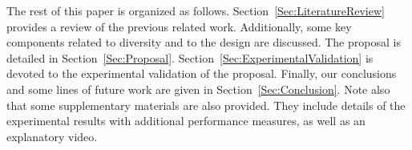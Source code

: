 The rest of this paper is organized as follows. 
%
Section~\ref{Sec:LiteratureReview} provides a review of the previous related work.
%
Additionally, some key components related to diversity and to the \VSDMOEA{} design are discussed.
%
The \VSDMOEA{} proposal is detailed in Section~\ref{Sec:Proposal}.
%
Section~\ref{Sec:ExperimentalValidation} is devoted to the experimental validation of the proposal.
%
Finally, our conclusions and some lines of future work are given in Section~\ref{Sec:Conclusion}.
%
Note also that some supplementary materials are also provided.
%
They include details of the experimental results with additional performance measures, 
as well as an explanatory video.
